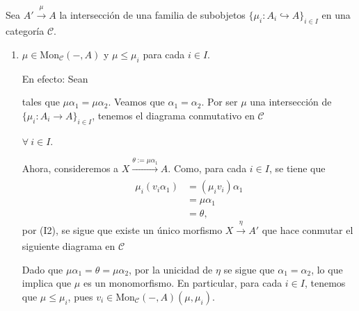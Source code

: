 \documentclass[tesis]{subfiles}
\begin{document}
\begin{Obs}\label{Mendoza-1.3.1}
    Sea $A'\xrightarrow[]{\mu}A$ la intersección de una familia de subobjetos $\{\mu_i:A_i\hookrightarrow A\}_{i\in I}$ en una categoría $\mathscr{C}$.

    \begin{enumerate}[label=(\arabic*)]
    
        \item $\mu\in\text{Mon}_\mathscr{C}(-,A)$ y $\mu\le\mu_i$ para cada $i\in I$.

            En efecto: Sean  tales que $\mu\alpha_1 = \mu\alpha_2$. Veamos que $\alpha_1=\alpha_2$. Por ser $\mu$ una intersección de $\{\mu_i:A_i\to A\}_{i\in I}$, tenemos el diagrama conmutativo en $\mathscr{C}$
            \begin{center}
                \quad $\forall \ i\in I$.
            \end{center}
            Ahora, consideremos a $X\xrightarrow[]{\theta:=\mu\alpha_1}A$. Como, para cada $i\in I$, se tiene que
            \begin{align*}
                \mu_i(v_i\alpha_1) &= (\mu_i v_i)\alpha_1 \\
                                   &= \mu\alpha_1 \\
                                   &= \theta,
            \end{align*}
            por (I2), se sigue que existe un único morfismo $X\xrightarrow[]{\eta}A'$ que hace conmutar el siguiente diagrama en $\mathscr{C}$
            \begin{center}
            \end{center}
            Dado que $\mu\alpha_1 = \theta = \mu\alpha_2$, por la unicidad de $\eta$ se sigue que $\alpha_1=\alpha_2$, lo que implica que $\mu$ es un monomorfismo. En particular, para cada $i\in I$, tenemos que $\mu\le\mu_i$, pues $v_i\in\text{Mon}_\mathscr{C}(-,A)(\mu,\mu_i)$.


\end{enumerate}
\end{Obs}
\end{document}
